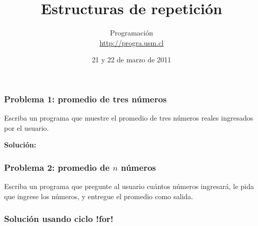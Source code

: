 \documentclass[12pt]{beamer}
\title{Estructuras de repetición}
\author{Programación \\ \url{http://progra.usm.cl}}
\date{21 y 22 de marzo de 2011}
\begin{document}
  \begin{frame}
    \maketitle
  \end{frame}

  \begin{frame}
    \frametitle{Problema 1: promedio de tres números}
    \label{problema-promedio-3-numeros}

    Escriba un programa que muestre el promedio de tres números reales
    ingresados por el usuario.
    
    

    \vfill
    \textbf{Solución:}
    
  \end{frame}
  

  \begin{frame}
    \frametitle{Problema 2: promedio de \(n\) números}
    \label{problema-promedio-n-numeros}

    Escriba un programa que pregunte al usuario
    cuántos números ingresará,
    le pida que ingrese los números,
    y entregue el promedio como salida.

    
  \end{frame}
  
  
  \begin{frame}
    \frametitle{Solución usando ciclo \li!for!}
    \label{solucion-promedio-n-numeros}

    
  \end{frame}
\end{document}
